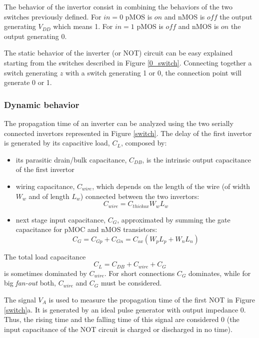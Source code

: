 The behavior of the invertor consist in combining the behaviors of the
two switches previously defined. For $in=0$ pMOS is $on$ and nMOS is
$off$ the output generating $V_{DD}$ which means 1. For $in=1$ pMOS is
$off$ and nMOS is $on$ the output generating 0.

The static behavior of the inverter (or NOT) circuit can be easy
explained starting from the switches described in Figure
\ref{0_switch}. Connecting together a switch generating $z$ with a
switch generating 1 or 0, the connection point will generate 0 or
1.

\subsubsection{Dynamic behavior}

The propagation time of an inverter can be analyzed using the two
serially connected invertors represented in Figure \ref{switch}. The
delay of the first invertor is generated by its capacitive load,
$C_{L}$, composed by:
\begin{itemize}
\item its parasitic drain/bulk capacitance, $C_{DB}$, is the intrinsic  output capacitance of the first invertor
\item wiring capacitance, $C_{wire}$, which depends on the length of the wire (of width $W_w$ and of length $L_w$) connected between the two invertors: $$C_{wire} = C_{thickox} W_w L_w$$
\item next stage input capacitance, $C_{G}$, approximated by summing the gate capacitance for pMOC and nMOS transistors: $$C_G = C_{Gp} + C_{Gn} = C_{ox}(W_p L_p + W_n L_n)$$
\end{itemize}


The total load capacitance
$$C_L = C_{DB} + C_{wire} + C_G$$
is sometimes dominated by $C_{wire}$. For short connections $C_G$ dominates, while for big {\em fan-out} both, $C_{wire}$ and $C_G$ must be considered.

The signal $V_A$ is used to measure the propagation time of the first NOT in Figure \ref{switch}a. It is generated by an ideal pulse generator with output impedance 0. Thus, the rising time and the falling time of this signal are considered 0 (the input capacitance of the NOT circuit is charged  or discharged in no time).


